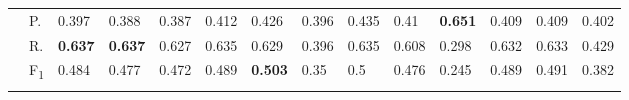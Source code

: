 \begin{tabularx}{\hsize}{p{1.3em}l Z  Z  Z  Z  Z  Z  Z  Z  Z  Z  Z  Z }
    & P.    & 0.397    & 0.388    & 0.387    & 0.412    & 0.426    & 0.396    & 0.435    & 0.41    & \textbf{ 0.651 }    & 0.409    & 0.409    & 0.402 \\
    & R.    & \textbf{ 0.637 }    & \textbf{ 0.637 }    & 0.627    & 0.635    & 0.629    & 0.396    & 0.635    & 0.608    & 0.298    & 0.632    & 0.633    & 0.429 \\
    & F\textsubscript{1}    & 0.484    & 0.477    & 0.472    & 0.489    & \textbf{ 0.503 }    & 0.35    & 0.5    & 0.476    & 0.245    & 0.489    & 0.491    & 0.382 \\
     \midrule {}

\end{tabularx}
